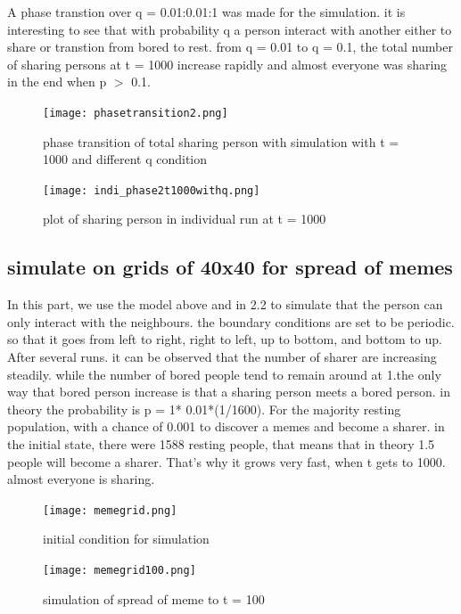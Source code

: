\documentclass[12pt]{article}
\begin{document}
{A phase transtion over q = 0.01:0.01:1 was made for the simulation. it is interesting to see that with probability q a person interact with another either to share or transtion from bored to rest. from q = 0.01 to q = 0.1, the total number of sharing persons at t = 1000 increase rapidly and almost everyone was sharing in the end when p $>$ 0.1. 
\begin{figure}[H] %
\centering
\texttt{[image: phasetransition2.png]}
\caption{phase transition of total sharing person with simulation with t = 1000 and different q condition }
\label{fig:phasetransition2}
\end{figure}

\begin{figure}[H] %
\centering
\texttt{[image: indi\_phase2t1000withq.png]}
\caption{plot of sharing person in individual run at t = 1000 }
\label{fig:phasetransition2indi1000}
\end{figure}

\subsection{simulate on grids of 40x40 for spread of memes}
In this part, we use the model above and in 2.2 to simulate that the person can only interact with the neighbours. the boundary conditions are set to be periodic. so that it goes from left to right, right to left, up to bottom, and bottom to up. After several runs. it can be observed that the number of sharer are increasing steadily. while the number of bored people tend to remain around at 1.the only way that bored person increase is that a sharing person meets a bored person. in theory the probability is p = 1* 0.01*(1/1600). For the majority resting population, with a chance of 0.001 to discover a memes and become a sharer. in the initial state, there were 1588 resting people, that means that in theory 1.5 people will become a sharer. That's why it grows very fast, when t gets to 1000. almost everyone is sharing. 

\begin{figure}[H] %
\centering
\texttt{[image: memegrid.png]}
\caption{initial condition for simulation}
\label{fig:memegrid0}
\end{figure}

\begin{figure}[H] %
\centering
\texttt{[image: memegrid100.png]}
\caption{simulation of spread of meme to t = 100}
\label{fig:memegrid100}
\end{figure}

}
\end{document}
